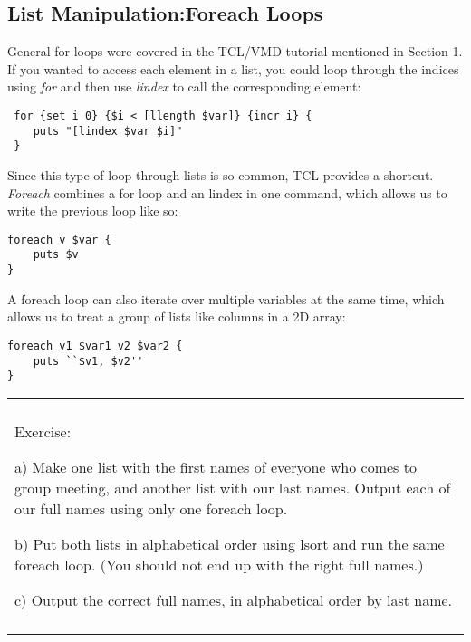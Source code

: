 \documentclass[letter,11pt]{article}
\newenvironment{exercise}
    {\begin{center}
    \begin{tabular}{|p{0.9\textwidth}|}
    \hline\\
    }
    { 
    \\\\\hline
    \end{tabular} 
    \end{center}
    }
\begin{document}
\subsection{List Manipulation:Foreach Loops}
\label{subsec:foreach}
General for loops were covered in the TCL/VMD tutorial mentioned in Section 1. %
%
%
%
If you wanted to access each element in a list, you could loop through the indices using {\it for} and then use {\it lindex} to call the corresponding element: 
\begin{lstlisting}
 for {set i 0} {$i < [llength $var]} {incr i} {
    puts "[lindex $var $i]" 	
 }
\end{lstlisting} 
Since this type of loop through lists is so common, TCL provides a shortcut. {\it Foreach} combines a for loop and an lindex in one command, which allows us to write the previous loop like so: 
\begin{lstlisting}
foreach v $var {
	puts $v
}
\end{lstlisting}
A foreach loop can also iterate over multiple variables at the same time, which allows us to treat a group of lists like columns in a 2D array:
\begin{lstlisting}
foreach v1 $var1 v2 $var2 {
	puts ``$v1, $v2''
}
\end{lstlisting}
\begin{exercise}
Exercise: 

a) Make one list with the first names of everyone who comes to group meeting, and another list with our last names.  Output each of our full names using only one foreach loop.  

b) Put both  lists in alphabetical order using lsort and run the same foreach loop.  (You should not end up with the right full names.) 

c) Output the correct full names, in alphabetical order by last name.  
\end{exercise}
\end{document}
